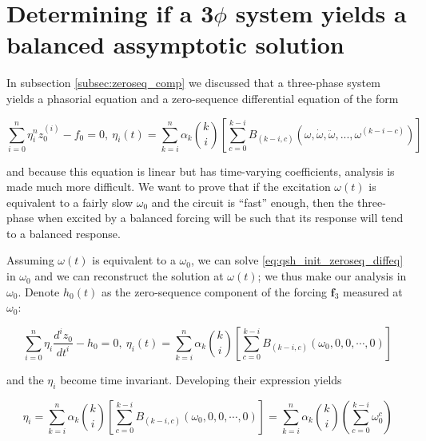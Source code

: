 \section{Determining if a 3$\phi$ system yields a balanced assymptotic solution}\label{sec:3p_assymp_freq} %

	In subsection \ref{subsec:zeroseq_comp} we discussed that a three-phase system yields a phasorial equation and a zero-sequence differential equation of the form

\begin{equation} \sum\limits_{i=0}^n \eta_i^n z_0^{(i)} - f_0 = 0,\ \eta_i(t) = \sum\limits_{k=i}^{n} \alpha_k {k\choose i} \left[\sum\limits_{c=0}^{k-i} B_{\left(k-i,c\right)}\left(\omega,\dot{\omega},\ddot{\omega},...,\omega^{(k-i-c)}\right)\right] \label{eq:qsh_init_zeroseq_diffeq}\end{equation}

	\noindent and because this equation is linear but has time-varying coefficients, analysis is made much more difficult. We want to prove that if the excitation $\omega(t)$ is equivalent to a fairly slow $\omega_0$ and the circuit is ``fast'' enough, then the three-phase when excited by a balanced forcing will be such that its response will tend to a balanced response.

	Assuming $\omega(t)$ is equivalent to a $\omega_0$, we can solve \eqref{eq:qsh_init_zeroseq_diffeq} in $\omega_0$ and we can reconstruct the solution at $\omega(t)$; we thus make our analysis in $\omega_0$. Denote $h_0(t)$ as the zero-sequence component of the forcing $\mathbf{f}_3$ measured at $\omega_0$:

\begin{equation} \sum\limits_{i=0}^n \eta_i \dfrac{d^i z_0}{dt^i} - h_0 = 0,\ \eta_i(t) = \sum\limits_{k=i}^{n} \alpha_k {k\choose i} \left[\sum\limits_{c=0}^{k-i} B_{\left(k-i,c\right)}\left(\omega_0,0,0,\cdots,0\right)\right] \label{eq:3p_zeroseq_omega0} \end{equation}

	\noindent and the $\eta_i$ become time invariant. Developing their expression yields

\begin{equation}
	\eta_i = \sum\limits_{k=i}^{n} \alpha_k {k\choose i} \left[\sum\limits_{c=0}^{k-i} B_{\left(k-i,c\right)}\left(\omega_0,0,0,\cdots,0\right)\right] = \sum_{k=i}^n \alpha_k {k\choose i} \left(\sum\limits_{c=0}^{k-i} \omega_0^c \right)
\end{equation}

